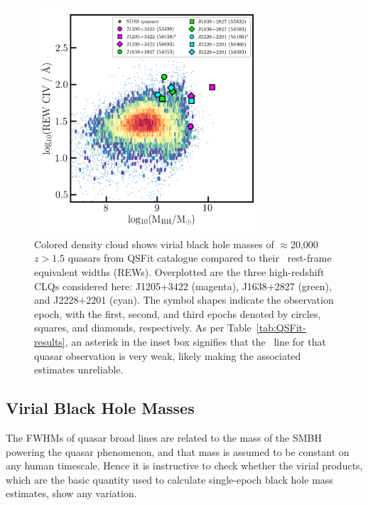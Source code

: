 \documentclass[fleqn,usenatbib]{mnras}
\begin{document}
\begin{figure}
  \centering
  \includegraphics[width=8.5cm, trim=0.2cm 0.2cm 0.0cm 0.2cm, clip]
  {figures/CIV_CLQs_MBHvsREW_20200519.png}
   \vspace{-12pt}
   \caption[]{
     Colored density cloud shows virial black hole masses of
     $\approx$20,000 $z>1.5$ quasars from QSFit catalogue
     \citep{Calderone2017} compared to their \civ\ rest-frame equivalent
     widths (REWs).  Overplotted are the three high-redshift CLQs
     considered here: J1205+3422 (magenta), J1638+2827 (green), and
     J2228+2201 (cyan).  The symbol shapes indicate the observation epoch,
     with the first, second, and third epochs denoted by circles, squares,
     and diamonds, respectively. As per Table~\ref{tab:QSFit-results}, an
     asterisk in the inset box signifies that the \civ\ line for that
     quasar observation is very weak, likely making the associated
     estimates unreliable.}
   \label{fig:CIV_MBHvsREW}
\end{figure}

\subsection{Virial Black Hole Masses}
\label{sec:BH_masses} 
The FWHMs of quasar broad lines are related to the mass of the SMBH
powering the quasar phenomenon, and that mass is assumed to be
constant on any human timescale.  Hence it is instructive to check
whether the virial products, which are the basic quantity used to
calculate single-epoch black hole mass estimates, show any
variation.
\end{document}
